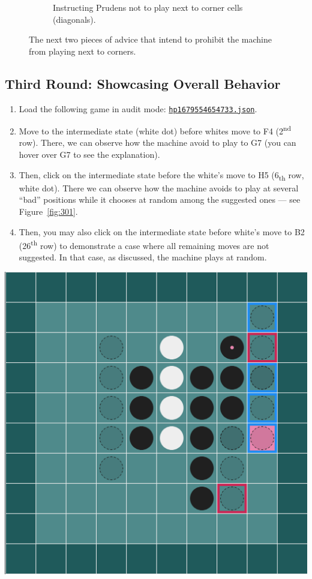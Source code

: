 \documentclass[a4paper,11pt]{article}
\theoremstyle{definition}
\theoremstyle{remark}
\numberwithin{equation}{section}
\begin{document}
\begin{figure}[!htb]
\begin{subfigure}[t]{0.48\textwidth}
			\caption{Instructing Prudens not to play next to corner cells (diagonals).}
			\label{fig:201d}
		\end{subfigure}
		\caption{The next two pieces of advice that intend to prohibit the machine from playing next to corners.}
		\label{fig:201}
	\end{figure}
	\subsection{Third Round: Showcasing Overall Behavior}\label{subsec:Third Round}
	\begin{minipage}{0.60\textwidth}
		\begin{enumerate}
			\item Load the following game in audit mode: \href{../games/hp_10_54_1679554654733.json}{\texttt{hp\textunderscore 1679554654733.json}}.
			\item Move to the intermediate state (white dot) before whites move to F4 (2\textsuperscript{nd} row). There, we can observe how the machine avoid to play to G7 (you can hover over G7 to see the explanation).
			\item Then, click on the intermediate state before the white's move to H5 (6\textsubscript{th} row, white dot). There we can observe how the machine avoids to play at several ``bad'' positions while it chooses at random among the suggested ones --- see Figure~\ref{fig:301}.
			\item Then, you may also click on the intermediate state before white's move to B2 (26\textsuperscript{th} row) to demonstrate a case where all remaining moves are not suggested. In that case, as discussed, the machine plays at random.
		\end{enumerate}
	\end{minipage}\hfill
	\begin{minipage}{0.35\textwidth}
		\includegraphics[width = \textwidth]{../assets/coaching_success_002.png}
		\label{fig:301}
	\end{minipage}
\end{document}

